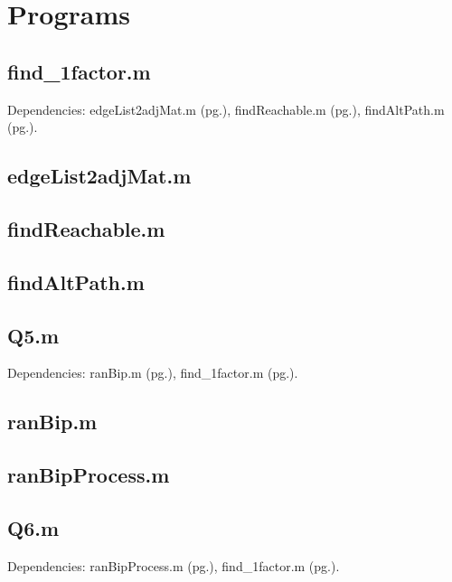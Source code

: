 \documentclass[a4paper]{article}
\begin{document}

\pagebreak
\section*{Programs}

\subsection*{find\_1factor.m}\label{Pfind_1factor}
Dependencies: edgeList2adjMat.m (pg.\pageref{PedgeList2adjMat}), findReachable.m (pg.\pageref{PfindReachable}), findAltPath.m (pg.\pageref{PfindAltPath}).


\subsection*{edgeList2adjMat.m}\label{PedgeList2adjMat}


\newpage
\subsection*{findReachable.m}\label{PfindReachable}


\subsection*{findAltPath.m}\label{PfindAltPath}


\newpage
\subsection*{Q5.m}\label{PQ5}
Dependencies: ranBip.m (pg.\pageref{PranBip}), find\_1factor.m (pg.\pageref{Pfind_1factor}).


\subsection*{ranBip.m}\label{PranBip}


\newpage
\subsection*{ranBipProcess.m}\label{PranBipProcess}


\newpage
\subsection*{Q6.m}\label{PQ6}
Dependencies: ranBipProcess.m (pg.\pageref{PranBipProcess}), find\_1factor.m (pg.\pageref{Pfind_1factor}).

\end{document}
